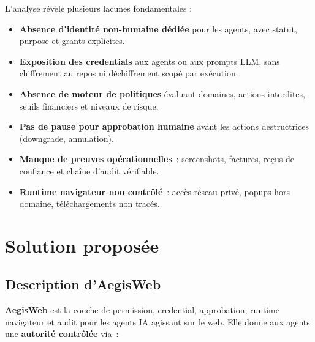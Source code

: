 L'analyse révèle plusieurs lacunes fondamentales :
\begin{itemize}[leftmargin=1.8cm, itemsep=4pt]
  \item \textbf{Absence d'identité non-humaine dédiée} pour les agents,
    avec statut, purpose et grants explicites.
  \item \textbf{Exposition des credentials} aux agents ou aux prompts LLM,
    sans chiffrement au repos ni déchiffrement scopé par exécution.
  \item \textbf{Absence de moteur de politiques} évaluant domaines,
    actions interdites, seuils financiers et niveaux de risque.
  \item \textbf{Pas de pause pour approbation humaine} avant les actions
    destructrices (downgrade, annulation).
  \item \textbf{Manque de preuves opérationnelles}~: screenshots, factures,
    reçus de confiance et chaîne d'audit vérifiable.
  \item \textbf{Runtime navigateur non contrôlé}~: accès réseau privé,
    popups hors domaine, téléchargements non tracés.
\end{itemize}

\section{Solution proposée}

\subsection{Description d'AegisWeb}

\textbf{AegisWeb} est la couche de permission, credential, approbation,
runtime navigateur et audit pour les agents IA agissant sur le web. Elle
donne aux agents une \textbf{autorité contrôlée} via~:

